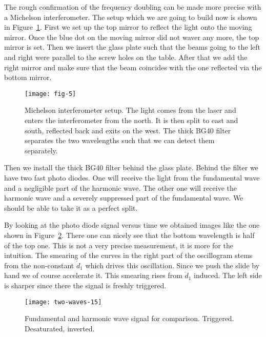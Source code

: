 \documentclass[11pt, english, fleqn, DIV=15, headinclude, BCOR=2cm]{scrreprt}
\begin{document}
The rough confirmation of the frequency doubling can be made more precise with
a Michelson interferometer. The setup which we are going to build now is shown
in Figure~\ref{fig:fig-5}. First we set up the top mirror to reflect the light
onto the moving mirror. Once the blue dot on the moving mirror did not waver
any more, the top mirror is set. Then we insert the glass plate such that
the beams going to the left and right were parallel to the screw holes on the
table. After that we add the right mirror and make sure that the beam coincides
with the one reflected via the bottom mirror.

\begin{figure}
    \centering
    \texttt{[image: fig-5]}
    \caption{%
        Michelson interferometer setup. The light comes from the laser and
        enters the interferometer from the north. It is then split to east and
        south, reflected back and exits on the west. The thick BG40 filter
        separates the two wavelengths such that we can detect them separately.
        \parencite[Figure~5]{lab-course/doubling/manual}
    }
    \label{fig:fig-5}
\end{figure}

Then we install the thick BG40 filter behind the glass plate. Behind the filter
we have two fast photo diodes. One will receive the light from the fundamental
wave and a negligible part of the harmonic wave. The other one will receive the
harmonic wave and a severely suppressed part of the fundamental wave. We should
be able to take it as a perfect split.

By looking at the photo diode signal versus time we obtained images like the
one shown in Figure~\ref{fig:two-waves-15}. There one can nicely see that the
bottom wavelength is half of the top one. This is not a very precise
measurement, it is more for the intuition. The smearing of the curves in the
right part of the oscillogram stems from the non-constant $\dot d_1$ which
drives this oscillation. Since we push the slide by hand we of course
accelerate it. This smearing rises from $\ddot d_1$ induced. The left side is
sharper since there the signal is freshly triggered.

\begin{figure}
    \centering
    \texttt{[image: two-waves-15]}
    \caption{%
        Fundamental and harmonic wave signal for comparison. Triggered.
        Desaturated, inverted.
    }
    \label{fig:two-waves-15}
\end{figure}
\end{document}
